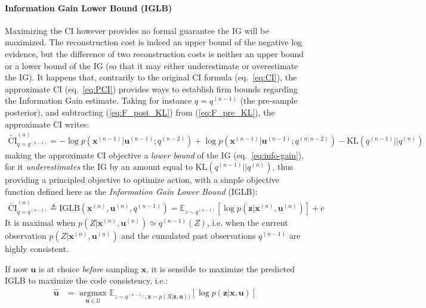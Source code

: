 \documentclass[12pt,twoside,openright]{article}
\begin{document}
\paragraph{Information Gain Lower Bound (IGLB)}
{\color{Purple} Maximizing the CI however provides no formal guarantee the IG will be maximized. The reconstruction cost is indeed an upper bound of the negative log evidence, but the difference of two reconstruction costs is neither an upper bound or a lower bound of the IG (so  that it may either underestimate or overestimate the IG). It happens that, contrarily to the original CI formula (eq.~\ref{eq:CI}), the approximate CI (eq.~\ref{eq:PCI}) provides ways to establish firm bounds regarding the Information Gain estimate.}
{\color{Purple}Taking for instance $q= q^{(n-1)}$ (the pre-sample posterior), and subtracting (\ref{eq:F_post_KL}) from (\ref{eq:F_pre_KL}), the approximate CI writes:}
\begin{align}
\tilde{\text{CI}}^{(n)}_{q = q^{(n-1)}} = 
-\log p(\boldsymbol{x}^{(n-1)}|\boldsymbol{u}^{(n-1)}; q^{(n-2)}) 
+ \log p(\boldsymbol{x}^{(n-1)}|\boldsymbol{u}^{(n-1)}; q^{(n;n-2)}) - \text{KL} (q^{(n-1)}||q^{(n)})
\end{align}
making the approximate CI objective {\color{Purple}a \emph{lower bound} of the IG (eq.~\ref{eq:info-gain}), for it} \emph{underestimates} the IG by an amount equal to $\text{KL} (q^{(n-1)}||q^{(n)})$, thus providing a {\color{Purple} principled objective} to optimize action, with  a simple objective function defined here as the {\color{Purple}\emph{Information Gain Lower Bound} (IGLB)}:
\begin{align}
\tilde{\text{CI}}^{(n)}_{q = q^{(n-1)}} 
\triangleq \text{IGLB}(\boldsymbol{x}^{(n)}, \boldsymbol{u}^{(n)}, q^{(n-1)})
= \mathbb{E}_{z\sim q^{(n-1)}} \left[\log p(\boldsymbol{z}|\boldsymbol{x}^{(n)}, \boldsymbol{u}^{(n)})\right] + c\label{eq:PCI-n-1}
\end{align}
It is maximal when $p(Z|\boldsymbol{x}^{(n)}, \boldsymbol{u}^{(n)})\simeq q^{(n-1)}(Z)$, i.e. when {\color{Purple} the current observation} $p(Z|\boldsymbol{x}^{(n)}, \boldsymbol{u}^{(n)})$ and {\color{Purple} the cumulated past observations} $q^{(n-1)}$ are highly consistent.

If now $\boldsymbol{u}$ is at choice \emph{before} sampling  $\boldsymbol{x}$, it is sensible to maximize the predicted {\color{Purple} IGLB} to maximize the code consistency, i.e.:
\begin{align}
\hat{\boldsymbol{u}} 
&= \underset{\boldsymbol{u} \in \mathcal{U}}{\text{ argmax }} \mathbb{E}_{z\sim q^{(n-1)}; \boldsymbol{x}\sim p(X|\boldsymbol{z},\boldsymbol{u}))} 
\left[\log p(\boldsymbol{z}|\boldsymbol{x}, \boldsymbol{u})\right]\label{eq:LC-pred}
\end{align}
\end{document}
